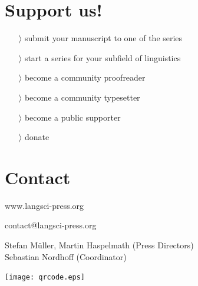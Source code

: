 \documentclass[
notumble,
nofoldmark,
]{leaflet}
\begin{document}
\section{ \sffamily \Large Support us!}
  
    \begin{itemize}
      \item[$\rangle$] submit your manuscript to one of the series
      \item[$\rangle$] start a series for your subfield of linguistics
      \item[$\rangle$] become a community proofreader 
      \item[$\rangle$] become a community typesetter
      \item[$\rangle$] become a public supporter
      \item[$\rangle$] donate
    \end{itemize} 

\section{ \sffamily \Large Contact}
 


{  \sffamily www.langsci-press.org}

{  \sffamily  contact@langsci-press.org}

Stefan M\"uller, Martin Haspelmath (Press Directors)\\
Sebastian Nordhoff (Coordinator)

\texttt{[image: qrcode.eps]}






% 

 

\loggingall
\end{document}
